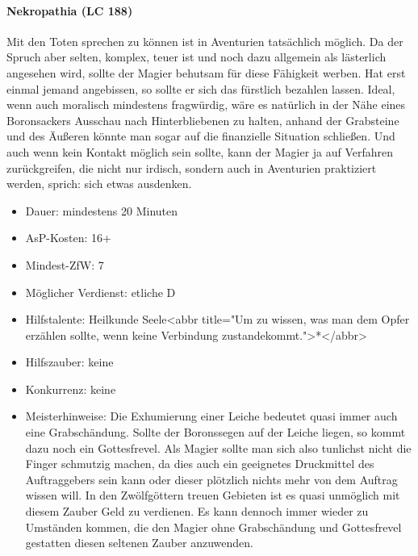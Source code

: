 \paragraph{Nekropathia (LC 188)}
Mit den Toten sprechen zu können ist in Aventurien tatsächlich möglich. Da der Spruch aber selten, komplex, teuer ist und noch dazu allgemein als lästerlich angesehen wird, sollte der Magier behutsam für diese Fähigkeit werben. Hat erst einmal jemand angebissen, so sollte er sich das fürstlich bezahlen lassen. Ideal, wenn auch moralisch mindestens fragwürdig, wäre es natürlich in der Nähe eines Boronsackers Ausschau nach Hinterbliebenen zu halten, anhand der Grabsteine und des Äußeren könnte man sogar auf die finanzielle Situation schließen. Und auch wenn kein Kontakt möglich sein sollte, kann der Magier ja auf Verfahren zurückgreifen, die nicht nur irdisch, sondern auch in Aventurien praktiziert werden, sprich: sich etwas ausdenken.
\begin{itemize}
	\item Dauer: mindestens 20 Minuten
	\item AsP-Kosten: 16+
	\item Mindest-ZfW: 7
	\item Möglicher Verdienst: etliche D
	\item Hilfstalente: Heilkunde Seele<abbr title="Um zu wissen, was man dem Opfer erzählen sollte, wenn keine Verbindung zustandekommt.">*</abbr>
	\item Hilfszauber: keine
	\item Konkurrenz: keine
	\item Meisterhinweise: Die Exhumierung einer Leiche bedeutet quasi immer auch eine Grabschändung. Sollte der Boronssegen auf der Leiche liegen, so kommt dazu noch ein Gottesfrevel. Als Magier sollte man sich also tunlichst nicht die Finger schmutzig machen, da dies auch ein geeignetes Druckmittel des Auftraggebers sein kann oder dieser plötzlich nichts mehr von dem Auftrag wissen will. In den Zwölfgöttern treuen Gebieten ist es quasi unmöglich mit diesem Zauber Geld zu verdienen. Es kann dennoch immer wieder zu Umständen kommen, die den Magier ohne Grabschändung und Gottesfrevel gestatten diesen seltenen Zauber anzuwenden.
\end{itemize}

